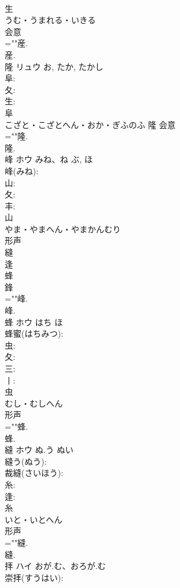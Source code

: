 \documentclass[8pt]{extreport}
\begin{document}
\begin{CJK}{UTF8}{min}
\\	生	
\\	うむ・うまれる・いきる	
\\	会意 
\\	=""産.
\\	産.
\\	隆	リュウ		お, たか, たかし	
\\	阜: 
\\	夂: 
\\	生: 
\\	阜	
\\	こざと・こざとへん・おか・ぎふのふ	隆	会意 
\\	=""隆.
\\	隆.
\\	峰	ホウ	みね、ね	ぶ, ほ	
\\	峰(みね): 
\\	山: 
\\	夂: 
\\	丰: 
\\	山	
\\	やま・やまへん・やまかんむり	
\\	形声 
\\	縫 
\\	逢 
\\	蜂 
\\	鋒 
\\	=""峰.
\\	峰.
\\	蜂	ホウ	はち	ほ	
\\	蜂蜜(はちみつ): 
\\	虫: 
\\	夂: 
\\	三: 
\\	丨: 
\\	虫	
\\	むし・むしへん	
\\	形声 
\\	=""蜂.
\\	蜂.
\\	縫	ホウ	ぬ.う	ぬい	
\\	縫う(ぬう): 
\\	裁縫(さいほう): 
\\	糸: 
\\	逢: 
\\	糸	
\\	いと・いとへん	
\\	形声 
\\	=""縫.
\\	縫.
\\	拝	ハイ	おが.む、おろが.む		
\\	崇拝(すうはい): 

\end{CJK}
\end{document}
